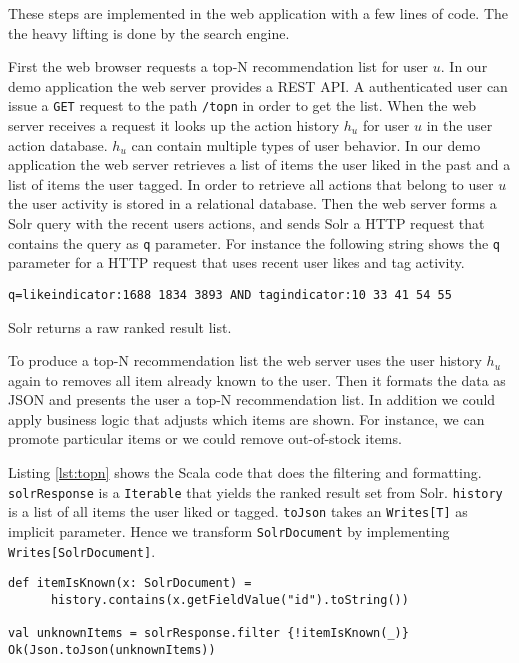These steps are implemented in the web application with a few lines of code. The the heavy lifting is done by the search engine.

First the web browser requests a top-N recommendation list for user $u$. In our demo application the web server provides a REST API. A authenticated user can issue a \verb|GET| request to the path \verb|/topn| in order to get the list. 
When the web server receives a request it looks up the action history $h_u$ for user $u$ in the user action database. $h_u$ can contain multiple types of user behavior. In our demo application the web server retrieves a list of items the user liked in the past and a list of items the user tagged. In order to retrieve all actions that belong to user $u$ the user activity is stored in a relational database.
Then the web server forms a Solr query with the recent users actions, and sends Solr a HTTP request that contains the query as \verb|q| parameter. For instance the following string shows the \verb|q| parameter for a HTTP request that uses recent user likes and tag activity.
\begin{verbatim}
q=likeindicator:1688 1834 3893 AND tagindicator:10 33 41 54 55 
\end{verbatim}
Solr returns a raw ranked result list. 

To produce a top-N recommendation list the web server uses the user history $h_u$ again to removes all item already known to the user. Then it formats the data as JSON and presents the user a top-N recommendation list. In addition we could apply business logic that adjusts which items are shown. For instance, we can promote particular items or we could remove out-of-stock items.

Listing \ref{lst:topn} shows the Scala code that does the filtering and formatting.
\verb|solrResponse| is a \verb|Iterable| that yields the ranked result set from Solr. \verb|history| is a list of all items the user liked or tagged. \verb|toJson| takes an \verb|Writes[T]| as implicit parameter. Hence we transform \verb|SolrDocument| by implementing \verb|Writes[SolrDocument]|.

\begin{lstlisting}[caption={The web server removes items already known and formats the the items in JSON},label={lst:topn}]
def itemIsKnown(x: SolrDocument) =
      history.contains(x.getFieldValue("id").toString())
      
val unknownItems = solrResponse.filter {!itemIsKnown(_)}
Ok(Json.toJson(unknownItems))
\end{lstlisting}

